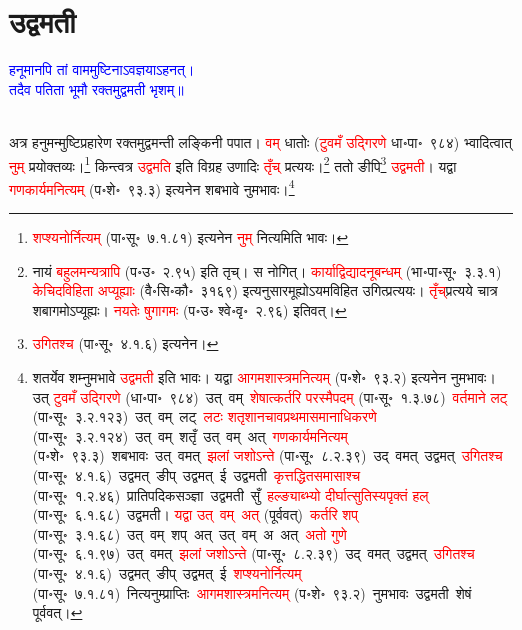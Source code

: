 \section[उद्वमती]{उद्वमती}
\centering\textcolor{blue}{हनूमानपि तां वाममुष्टिनाऽवज्ञयाऽहनत्।\nopagebreak\\
तदैव पतिता भूमौ रक्तमुद्वमती भृशम्॥}\nopagebreak\\
\\
\begin{sloppypar}\justifying\noindent\hspace{10mm} अत्र हनुमन्मुष्टि\-प्रहारेण रक्तमुद्वमन्ती लङ्किनी पपात। \textcolor{red}{वम्} धातोः (\textcolor{red}{टुवमँ उद्गिरणे} धा॰पा॰~९८४) भ्वादित्वात् \textcolor{red}{नुम्} प्रयोक्तव्यः।\footnote{\textcolor{red}{शप्श्यनोर्नित्यम्} (पा॰सू॰~७.१.८१) इत्यनेन \textcolor{red}{नुम्} नित्यमिति भावः।} किन्त्वत्र \textcolor{red}{उद्वमति} इति विग्रह उणादिः \textcolor{red}{तृँच्} प्रत्ययः।\footnote{नायं \textcolor{red}{बहुलमन्यत्रापि} (प॰उ॰~२.९५) इति तृच्। स नोगित्। \textcolor{red}{कार्याद्विद्यादनूबन्धम्} (भा॰पा॰सू॰~३.३.१) \textcolor{red}{केचिदविहिता अप्यूह्याः} (वै॰सि॰कौ॰~३१६९) इत्यनुसारमूह्योऽ\-यमविहित उगित्प्रत्ययः। \textcolor{red}{तृँच्‌}\-प्रत्यये चात्र शबागमोऽप्यूह्यः। \textcolor{red}{नयतेः षुगागमः} (प॰उ॰ श्वे॰वृ॰~२.९६) इतिवत्।} ततो ङीपि\footnote{\textcolor{red}{उगितश्च} (पा॰सू॰~४.१.६) इत्यनेन।} \textcolor{red}{उद्वमती}। यद्वा \textcolor{red}{गण\-कार्यमनित्यम्} (प॰शे॰~९३.३) इत्यनेन शबभावे नुमभावः।\footnote{शतर्येव शम्नुमभावे \textcolor{red}{उद्वमती} इति भावः। यद्वा \textcolor{red}{आगम\-शास्त्रमनित्यम्} (प॰शे॰~९३.२) इत्यनेन नुमभावः। उत् \textcolor{red}{टुवमँ उद्गिरणे} (धा॰पा॰~९८४)~\arrow उत्~वम्~\arrow \textcolor{red}{शेषात्कर्तरि परस्मैपदम्} (पा॰सू॰~१.३.७८)~\arrow \textcolor{red}{वर्तमाने लट्} (पा॰सू॰~३.२.१२३)~\arrow उत्~वम्~लट्~\arrow \textcolor{red}{लटः शतृशानचावप्रथमा\-समानाधिकरणे} (पा॰सू॰~३.२.१२४)~\arrow उत्~वम्~शतृँ~\arrow उत्~वम्~अत्~\arrow \textcolor{red}{गण\-कार्यमनित्यम्} (प॰शे॰~९३.३)~\arrow शबभावः~\arrow उत्~वमत्~\arrow \textcolor{red}{झलां जशोऽन्ते} (पा॰सू॰~८.२.३९)~\arrow उद्~वमत्~\arrow उद्वमत्~\arrow \textcolor{red}{उगितश्च} (पा॰सू॰~४.१.६)~\arrow उद्वमत्~ङीप्‌~\arrow उद्वमत्~ई~\arrow उद्वमती~\arrow \textcolor{red}{कृत्तद्धित\-समासाश्च} (पा॰सू॰~१.२.४६)~\arrow प्रातिपदिक\-सञ्ज्ञा~\arrow उद्वमती~सुँ~\arrow \textcolor{red}{हल्ङ्याब्भ्यो दीर्घात्सुतिस्यपृक्तं हल्} (पा॰सू॰~६.१.६८)~\arrow उद्वमती। \textcolor{red}{यद्वा उत्~वम्~अत्} (पूर्ववत्)~\arrow \textcolor{red}{कर्तरि शप्‌} (पा॰सू॰~३.१.६८)~\arrow उत्~वम्~शप्~अत्~\arrow उत्~वम्~अ~अत्~\arrow \textcolor{red}{अतो गुणे} (पा॰सू॰~६.१.९७)~\arrow उत्~वमत्~\arrow \textcolor{red}{झलां जशोऽन्ते} (पा॰सू॰~८.२.३९)~\arrow उद्~वमत्~\arrow उद्वमत्~\arrow \textcolor{red}{उगितश्च} (पा॰सू॰~४.१.६)~\arrow उद्वमत्~ङीप्‌~\arrow उद्वमत्~ई~\arrow \textcolor{red}{शप्श्यनोर्नित्यम्} (पा॰सू॰~७.१.८१)~\arrow नित्यनुम्प्राप्तिः~\arrow \textcolor{red}{आगम\-शास्त्रमनित्यम्} (प॰शे॰~९३.२)~\arrow नुमभावः~\arrow उद्वमती~\arrow शेषं पूर्ववत्।}\end{sloppypar}
